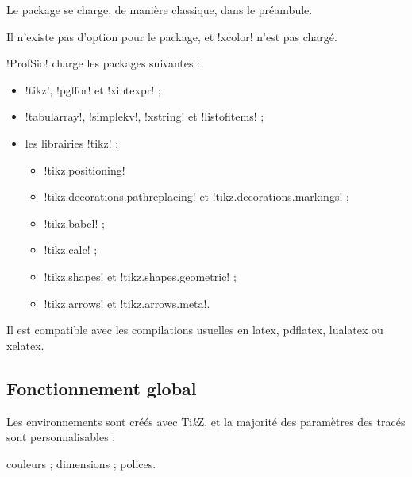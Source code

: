 \documentclass[french,a4paper,11pt]{article}
\providecommand\tikzlogo{Ti\textit{k}Z}
\let\TikZ\tikzlogo
\begin{document}
\begin{importantblock}
Le package se charge, de manière classique, dans le préambule.

Il n'existe pas d'option pour le package, et \packagetex!xcolor! n'est pas chargé.
\end{importantblock}


\begin{noteblock}
\packagetex!ProfSio! charge les packages suivantes :

\begin{itemize}
	\item \packagetex!tikz!, \packagetex!pgffor! et \packagetex!xintexpr! ;
	\item \packagetex!tabularray!, \packagetex!simplekv!, \packagetex!xstring! et \packagetex!listofitems! ;
	\item les librairies \packagetex!tikz! :
	\begin{itemize}
		\item \motcletex!tikz.positioning!
		\item \motcletex!tikz.decorations.pathreplacing! et \motcletex!tikz.decorations.markings! ;
		\item \motcletex!tikz.babel! ;
		\item \motcletex!tikz.calc! ;
		\item \motcletex!tikz.shapes! et \motcletex!tikz.shapes.geometric! ;
		\item \motcletex!tikz.arrows! et \motcletex!tikz.arrows.meta!.
	\end{itemize}
\end{itemize}

Il est compatible avec les compilations usuelles en \textsf{latex}, \textsf{pdflatex}, \textsf{lualatex} ou \textsf{xelatex}.
\end{noteblock}

\subsection{Fonctionnement global}

\begin{tipblock}
Les environnements sont créés avec \TikZ, et la majorité des paramètres des tracés sont personnalisables :

\hfill{}couleurs ; dimensions ; polices.\hfill~
\end{tipblock}
\end{document}
